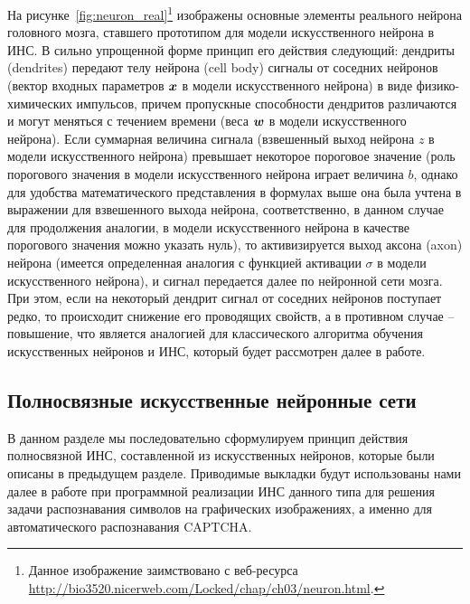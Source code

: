 \documentclass[a4paper,12pt,russian]{article} %
\begin{document}
На рисунке~\ref{fig:neuron_real}\footnote{
	Данное изображение заимствовано с веб-ресурса \url{http://bio3520.nicerweb.com/Locked/chap/ch03/neuron.html}.
}
изображены основные элементы реального нейрона головного мозга, ставшего прототипом для модели искусственного нейрона в ИНС.
В сильно упрощенной форме принцип его действия следующий: дендриты (dendrites) передают телу нейрона (cell body) сигналы от соседних нейронов (вектор входных параметров $\bm{x}$ в модели искусственного нейрона) в виде физико-химических импульсов, причем пропускные способности дендритов различаются и могут меняться с течением времени (веса $\bm{w}$ в модели искусственного нейрона).
Если суммарная величина сигнала (взвешенный выход нейрона $z$ в модели искусственного нейрона) превышает некоторое пороговое значение (роль порогового значения в модели искусственного нейрона играет величина $b$, однако для удобства математического представления в формулах выше она была учтена в выражении для взвешенного выхода нейрона, соответственно, в данном случае для продолжения аналогии, в модели искусственного нейрона в качестве порогового значения можно указать нуль), то активизируется выход аксона (axon) нейрона (имеется определенная аналогия с функцией активации $\sigma$ в модели искусственного нейрона), и сигнал передается далее по нейронной сети мозга. При этом, если на некоторый дендрит сигнал от соседних нейронов поступает редко, то происходит снижение его проводящих свойств, а в противном случае -- повышение, что является аналогией для классического алгоритма обучения искусственных нейронов и ИНС, который будет рассмотрен далее в работе. 

\newpage
\subsection{Полносвязные искусственные нейронные сети} \label{ss:review_nn}

В данном разделе мы последовательно сформулируем принцип действия полносвязной ИНС, составленной из искусственных нейронов, которые были описаны в предыдущем разделе.
Приводимые выкладки будут использованы нами далее в работе при программной реализации ИНС данного типа для решения задачи распознавания символов на графических изображениях, а именно для автоматического распознавания CAPTCHA.
\end{document}
